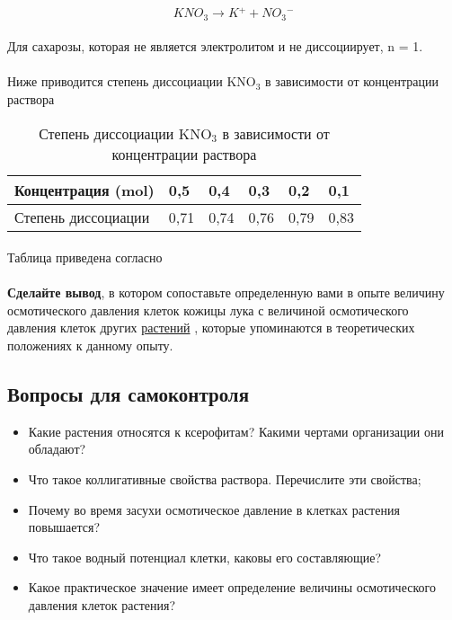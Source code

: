 \begin{equation}
	KNO_3 \rightarrow K{^+} + NO{_3}{^-}
\end{equation}

\paragraph*{}Для сахарозы, которая не является электролитом и не диссоциирует, n = 1.

\paragraph*{}Ниже приводится степень диссоциации KNO$_3$ в зависимости от концентрации раствора

\begin{table}[h!]
\centering
\caption{Степень диссоциации KNO$_3$ в зависимости от концентрации раствора}
	\begin{tabularx}{\linewidth}{|p{5cm}|X|X|X|X|X|}
	
	\hline Концентрация (\gls{mol})     & 0,5  & 0,4  & 0,3  & 0,2  & 0,1 \\
	\hline Степень диссоциации & 0,71 & 0,74 & 0,76 & 0,79 & 0,83 \\
	\hline
	\end{tabularx}
	
\paragraph*{}Таблица приведена согласно \cite{vorob_2013}
\end{table}

\paragraph*{}\textbf{Сделайте вывод}, в котором сопоставьте определенную вами в опыте величину осмотического давления клеток кожицы лука с величиной осмотического давления клеток других \hyperlink{p_osm_other_plants}{растений} , которые упоминаются в теоретических положениях к данному опыту.

\subsection*{Вопросы для самоконтроля}

	\begin{itemize}
		\item Какие растения относятся к \hypertarget{xserofites}{ксерофитам}? Какими чертами организации они обладают?
		\item Что такое коллигативные свойства раствора. Перечислите эти свойства;
		\item Почему во время засухи осмотическое давление в клетках растения повышается?
		\item Что такое водный потенциал клетки, каковы его составляющие?
		\item Какое практическое значение имеет определение величины осмотического давления клеток растения?
 	
	\end{itemize}